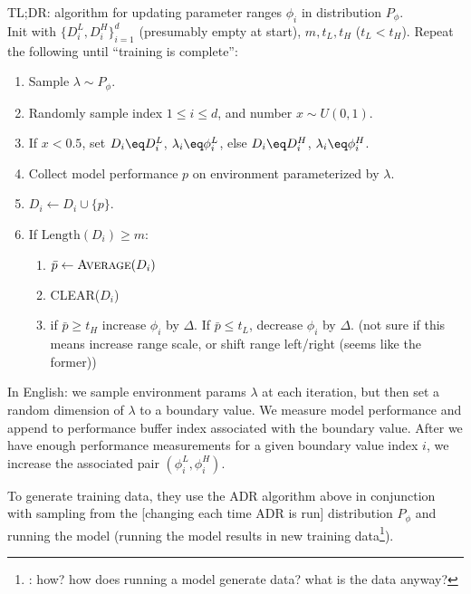\documentclass[11pt]{article}
\begin{document}
\begin{algorithm}
	TL;DR: algorithm for updating parameter ranges $\phi_i$ in distribution $P_{\phi}$.\\
	 
	Init with  $\{ D_i^L, D_i^H \}_{i=1}^d$ (presumably empty at start),  $m, t_L, t_H$ ($t_L < t_H$). Repeat the following until ``training is complete'':
	\begin{enumerate}
		\item Sample $\lambda \sim P_{\phi}$. 
		
		\item Randomly sample index $1 \le i \le d$, and number $x \sim U(0, 1)$. 
		
		\item If $x < 0.5$, set $D_i \eq D_i^L$, $\lambda_i \eq \phi_i^L$, else  $D_i \eq D_i^H$, $\lambda_i \eq \phi_i^H$. 
		
		\item Collect model performance $p$ on environment parameterized by $\lambda$. 
		
		\item $D_i \leftarrow D_i \cup \{ p  \}$. 
		
		\item If $\text{Length}(D_i) \ge m$:
		\begin{enumerate}
			\item $\bar p \leftarrow \textsc{Average}(D_i)$
			\item \textsc{CLEAR}($D_i$)
			\item if $\bar p \ge t_H$ increase $\phi_i$ by $\Delta$. If $\bar p \le t_L$, decrease $\phi_i$ by $\Delta$. (not sure if this means increase range scale, or shift range left/right (seems like the former))
		\end{enumerate}
	\end{enumerate}

	In English: we sample environment params $\lambda$ at each iteration, but then set a random dimension of $\lambda$ to a boundary value. We measure model performance and append to performance buffer index associated with the boundary value. After we have enough performance measurements for a given boundary value index $i$, we increase the associated pair $(\phi_i^L, \phi_i^H)$.
\end{algorithm}

To generate training data, they use the ADR algorithm above in conjunction with sampling from the [changing each time ADR is run] distribution $P_{\phi}$ and running the model (running the model results in new training data\footnote{: how? how does running a model generate data? what is the data anyway?}). 
\end{document}
